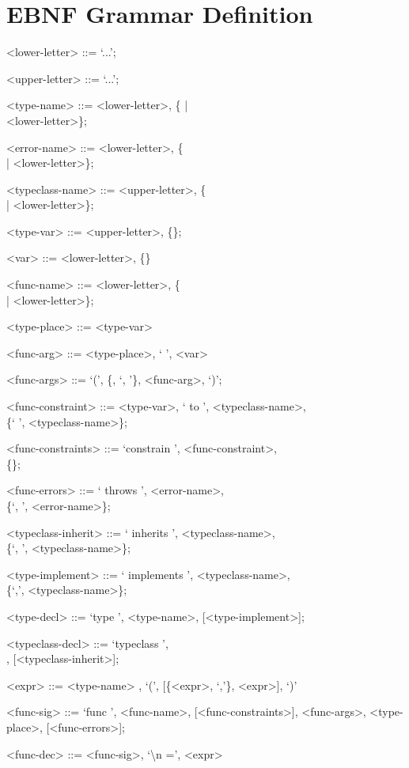 \documentclass{acm_proc_article-sp}
\begin{document}
\appendix
\section{EBNF Grammar Definition}
    \label{app:Grammar}
    \begin{grammar}

    <lower-letter> ::= `...';

    <upper-letter> ::= `...';

    <type-name> ::= <lower-letter>, \{<upper-letter> |
    \\ <lower-letter>\};

    <error-name> ::= <lower-letter>, \{<upper-letter>
    \\ | <lower-letter>\};

    <typeclass-name> ::= <upper-letter>, \{<upper-letter>
    \\ | <lower-letter>\};

    <type-var> ::= <upper-letter>, \{<upper-letter>\};

    <var> ::= <lower-letter>, \{<lower-letter>\}

    <func-name> ::= <lower-letter>, \{<upper-letter>
    \\ | <lower-letter>\};

    <type-place> ::= <type-var>

    <func-arg> ::= <type-place>, ` ', <var>

    <func-args> ::= `(', \{<func-arg>, `, '\}, <func-arg>, `)';

    <func-constraint> ::= <type-var>, ` to ', <typeclass-name>,
    \\ \{` ', <typeclass-name>\};

    <func-constraints> ::= `constrain ', <func-constraint>,
    \\ \{<func-constraint>\};

    <func-errors> ::= ` throws ', <error-name>,
    \\ \{`, ', <error-name>\};

    <typeclass-inherit> ::= ` inherits ', <typeclass-name>,
    \\ \{`, ', <typeclass-name>\};

    <type-implement> ::= ` implements ', <typeclass-name>,
     \\\{`,', <typeclass-name>\};

    <type-decl> ::= `type ', <type-name>, [<type-implement>];

    <typeclass-decl> ::= `typeclass ',
    \\<typeclass-name>, [<typeclass-inherit>];

    <expr> ::= <type-name>
    , `(', [\{<expr>, `,'\}, <expr>], `)'

    <func-sig> ::= `func ', <func-name>, [<func-constraints>], 
    <func-args>, <type-place>, [<func-errors>];

    <func-dec> ::= <func-sig>, `\textbackslash n =', <expr> 

    \end{grammar}



\balancecolumns
\end{document}
